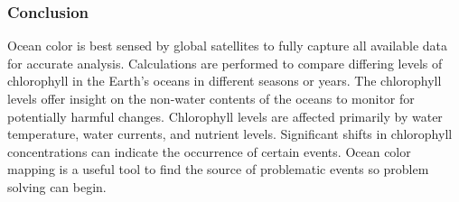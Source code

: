 \begin{frame}\frametitle{Conclusion} 
Ocean color is best sensed by global satellites to fully capture all available data for accurate analysis. Calculations are performed to compare differing levels of chlorophyll in the Earth’s oceans in different seasons or years. The chlorophyll levels offer insight on the non-water contents of the oceans to monitor for potentially harmful changes. Chlorophyll levels are affected primarily by water temperature, water currents, and nutrient levels. Significant shifts in chlorophyll concentrations can indicate the occurrence of certain events. Ocean color mapping is a useful tool to find the source of problematic events so problem solving can begin. 


\end{frame}
